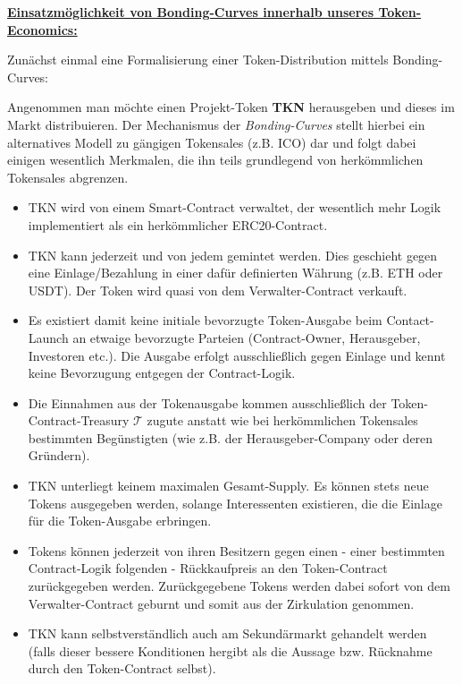 \vspace{0.3cm}

\underline{\textbf{Einsatzmöglichkeit von Bonding-Curves innerhalb unseres Token-Economics:}}

\vspace{0.2cm}

Zunächst einmal eine Formalisierung einer Token-Distribution mittels Bonding-Curves:

\vspace{0.2cm}

\begin{Def}
\label{defBC}

Angenommen man möchte einen Projekt-Token \textbf{TKN} herausgeben und dieses im Markt distribuieren. Der Mechanismus der \textit{Bonding-Curves} stellt hierbei ein alternatives Modell zu gängigen Tokensales (z.B. ICO) dar und folgt dabei einigen wesentlich Merkmalen, die ihn teils grundlegend von herkömmlichen Tokensales abgrenzen.

\begin{itemize}
  \item TKN wird von einem Smart-Contract verwaltet, der wesentlich mehr Logik implementiert als ein herkömmlicher ERC20-Contract.
  \item TKN kann jederzeit und von jedem gemintet werden. Dies geschieht gegen eine Einlage/Bezahlung in einer dafür definierten Währung (z.B. ETH oder USDT). Der Token wird quasi von dem Verwalter-Contract verkauft.
  \item Es existiert damit keine initiale bevorzugte Token-Ausgabe beim Contact-Launch an etwaige bevorzugte Parteien (Contract-Owner, Herausgeber, Investoren etc.). Die Ausgabe erfolgt ausschließlich gegen Einlage und kennt keine Bevorzugung entgegen der Contract-Logik. 
  \item Die Einnahmen aus der Tokenausgabe kommen ausschließlich der Token-Cont\-ract-Treasury $\mathbf{\mathcal{T}}$ zugute anstatt wie bei herkömmlichen Tokensales bestimmten Begünstigten (wie z.B. der Herausgeber-Company oder deren Gründern).
  \item TKN unterliegt keinem maximalen Gesamt-Supply. Es können stets neue Tokens ausgegeben werden, solange Interessenten existieren, die die Einlage für die Token-Ausgabe erbringen.
  \item Tokens können jederzeit von ihren Besitzern gegen einen - einer bestimmten Contract-Logik folgenden - Rückkaufpreis an den Token-Contract zurückgegeben werden. Zurückgegebene Tokens werden dabei sofort von dem Verwalter-Contract geburnt und somit aus der Zirkulation genommen.
  \item TKN kann selbstverständlich auch am Sekundärmarkt gehandelt werden (falls dieser bessere Konditionen hergibt als die Aussage bzw. Rücknahme durch den Token-Contract selbst).
\end{itemize}


\end{Def}
